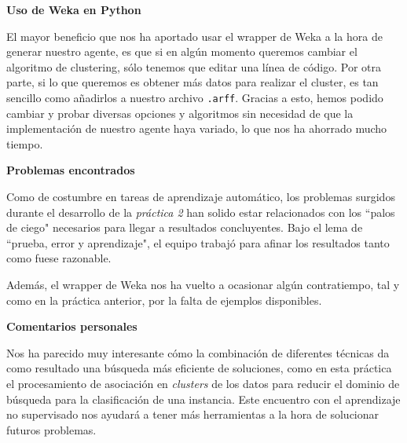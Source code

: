 \documentclass[12pt]{article}
\begin{document}
\vspace{0.5cm}
\centerline{\textbf{Uso de Weka en Python}}
\vspace{0.5cm}

El mayor beneficio que nos ha aportado usar el wrapper de Weka a la hora de generar nuestro agente, es que si en algún momento queremos cambiar el algoritmo de clustering, sólo tenemos que editar una línea de código. Por otra parte, si lo que queremos es obtener más datos para realizar el cluster, es tan sencillo como añadirlos a nuestro archivo \texttt{.arff}. Gracias a esto, hemos podido cambiar y probar diversas opciones y algoritmos sin necesidad de que la implementación de nuestro agente haya variado, lo que nos ha ahorrado mucho tiempo.

\vspace{0.5cm}
\centerline{\textbf{Problemas encontrados}}
\vspace{0.5cm}

Como de costumbre en tareas de aprendizaje automático, los problemas surgidos durante el desarrollo de la \textit{práctica 2} han solido estar relacionados con los ``palos de ciego" necesarios para llegar a resultados concluyentes. Bajo el lema de ``prueba, error y aprendizaje", el equipo trabajó para afinar los resultados tanto como fuese razonable.

Además, el wrapper de Weka nos ha vuelto a ocasionar algún contratiempo, tal y como en la práctica anterior, por la falta de ejemplos disponibles.

\vspace{0.5cm}
\centerline{\textbf{Comentarios personales}}
\vspace{0.5cm}

Nos ha parecido muy interesante cómo la combinación de diferentes técnicas da como resultado una búsqueda más eficiente de soluciones, como en esta práctica el procesamiento de asociación en \textit{clusters} de los datos para reducir el dominio de búsqueda para la clasificación de una instancia. Este encuentro con el aprendizaje no supervisado nos ayudará a tener más herramientas a la hora de solucionar futuros problemas.
\end{document}
